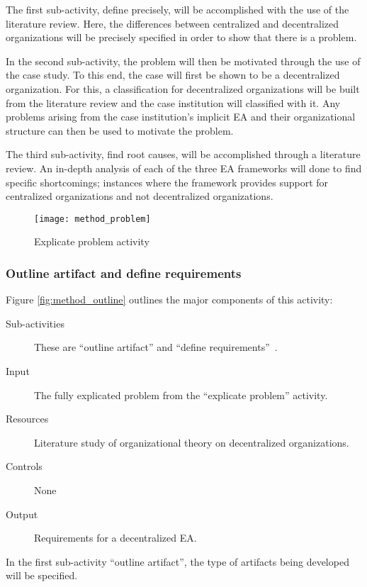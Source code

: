 The first sub-activity, define precisely, will be accomplished with the use of the literature review. Here, the differences between centralized and decentralized  organizations will be precisely specified in order to show that there is a problem. 

In the second sub-activity, the problem will then be motivated through the use of the case study. To this end, the case will first be shown to be a decentralized organization. For this, a classification for decentralized organizations will be built from the literature review and the case institution will classified with it. Any problems arising from the case institution's implicit EA and their organizational structure can then be used to motivate the problem. 

The third sub-activity, find root causes, will be accomplished through a literature review. An in-depth analysis of each of the three EA frameworks will done to find specific shortcomings; instances where the framework provides support for centralized organizations and not decentralized organizations. 

\begin{figure}
\centering
\texttt{[image: method\_problem]}
\caption{Explicate problem activity}
\label{fig:method_problem}
\end{figure}

\subsubsection*{Outline artifact and define requirements}

Figure \ref{fig:method_outline} outlines the major components of this activity:
\begin{description}
  \item[Sub-activities] These are ``outline artifact'' and ``define requirements''~\cite[Ch. 6]{johannessonPerjons2012}.
  \item[Input] The fully explicated problem from the ``explicate problem'' activity. 
  \item[Resources] Literature study of organizational theory on decentralized organizations. 
  \item[Controls] None
  \item[Output] Requirements for a decentralized EA. 
\end{description}

In the first sub-activity ``outline artifact'', the type of artifacts being developed will be specified. 

